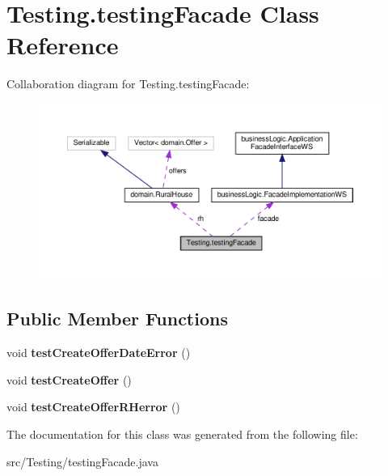 \hypertarget{class_testing_1_1testing_facade}{}\section{Testing.\+testing\+Facade Class Reference}
\label{class_testing_1_1testing_facade}


Collaboration diagram for Testing.\+testing\+Facade\+:
\nopagebreak
\begin{figure}[H]
\begin{center}
\leavevmode
\includegraphics[width=350pt]{class_testing_1_1testing_facade__coll__graph}
\end{center}
\end{figure}
\subsection*{Public Member Functions}
\begin{DoxyCompactItemize}
\item 
\mbox{\label{class_testing_1_1testing_facade_a6b9459e014babee913e6931ca7f193bd}} 
void {\bfseries test\+Create\+Offer\+Date\+Error} ()
\item 
\mbox{\label{class_testing_1_1testing_facade_a946dffccca05bf080e945a4787c940f3}} 
void {\bfseries test\+Create\+Offer} ()
\item 
\mbox{\label{class_testing_1_1testing_facade_ad01314b0219294b8da854dd42f4e769b}} 
void {\bfseries test\+Create\+Offer\+R\+Herror} ()
\end{DoxyCompactItemize}


The documentation for this class was generated from the following file\+:\begin{DoxyCompactItemize}
\item 
src/\+Testing/testing\+Facade.\+java\end{DoxyCompactItemize}
